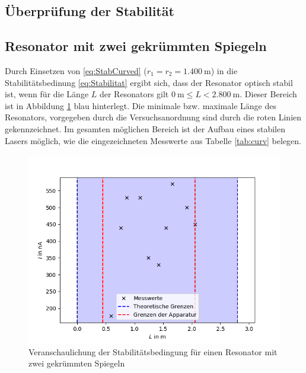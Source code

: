 \subsection{Überprüfung der Stabilität}
\subsection{Resonator mit zwei gekrümmten Spiegeln\label{sec:curved}}
Durch Einsetzen von \eqref{eq:StabCurved} ($r_1 = r_2 = \SI{1.400}{\metre}$) in die Stabilitätsbedinung \eqref{eq:Stabilitat} ergibt sich, dass der Resonator optisch stabil ist, wenn für die Länge $L$ der Resonators gilt $\SI{0}{\metre}\leq L<\SI{2.800}{\metre}$. Dieser Bereich ist in Abbildung \ref{fig:curved} blau hinterlegt. Die minimale bzw. maximale Länge des Resonators, vorgegeben durch die Versuchsanordnung sind durch die roten Linien gekennzeichnet. Im gesamten möglichen Bereich ist der Aufbau eines stabilen Lasers möglich, wie die eingezeichneten Messwerte aus Tabelle \ref{tab:curv} belegen.

\begin{figure}[h!]
	\centering
	\includegraphics[width=.7\textwidth]{PlotCurved2.png}
	\caption{Veranschaulichung der Stabilitätsbedingung für einen Resonator mit zwei gekrümmten Spiegeln}
	\label{fig:curved}
\end{figure}
\clearpage
